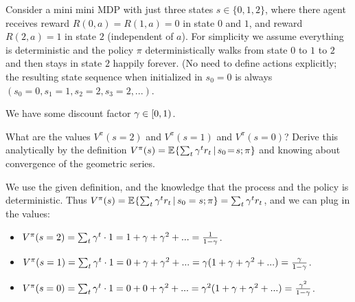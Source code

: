 

\renewcommand{\course}{Artificial Intelligence}
\renewcommand{\coursepicture}{course_ai}
\renewcommand{\coursedate}{Summer 2023}

\renewcommand{\exnum}{Exercise 4}

\exercises
{}
\exercisestitle



Consider a mini mini MDP with just three states $s\in\{0,1,2\}$, where there agent receives reward $R(0,a)=R(1,a)=0$ in state $0$ and $1$, and reward $R(2,a)=1$ in state $2$ (independent of $a$). For simplicity we assume everything is deterministic and the policy $\pi$ deterministically walks from state $0$ to $1$ to $2$ and then stays in state $2$ happily forever. (No need to define actions explicitly; the resulting state sequence when initialized in $s_0=0$ is always $(s_0=0, s_1=1, s_2=2, s_3=2, ...)$.

We have some discount factor $\gamma\in[0,1)$.

What are the values $V^\pi(s=2)$ and $V^\pi(s=1)$ and $V^\pi(s=0)$? Derive this analytically by the definition $V^\pi(s) = \mathbb{E}_{}\!\left\{ \textstyle\sum_t \gamma^t r_t \,|\, s_0\!=\!s; \pi \right\}$ and knowing about convergence of the geometric series.

\begin{solution}
    We use the given definition, and the knowledge that the process and the policy is deterministic. Thus
    $V^\pi(s) = \mathbb{E}_{}\!\left\{ \textstyle\sum_t \gamma^t r_t \,|\, s_0 = s ; \pi \right\} = \textstyle\sum_t \gamma^t r_t$, and we can plug in the values:

    \begin{itemize}
        \item $V^\pi(s=2) = \textstyle\sum_t \gamma^t \cdot 1 = 1 + \gamma + \gamma^2 + ... = \frac{1}{1 - \gamma}$.
        \item $V^\pi(s=1) = \textstyle\sum_t \gamma^t \cdot 1 = 0 + \gamma + \gamma^2 + ... = \gamma(1 + \gamma + \gamma^2 + ...) = \frac{\gamma}{1 - \gamma}$.
        \item $V^\pi(s=0) = \textstyle\sum_t \gamma^t \cdot 1 = 0 + 0 + \gamma^2 + ... = \gamma^2(1 + \gamma + \gamma^2 + ...) = \frac{\gamma^2}{1 - \gamma}$.
    \end{itemize}
\end{solution}




